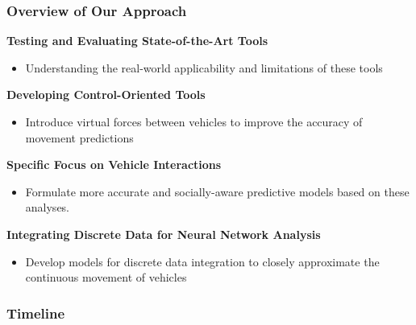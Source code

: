 \begin{frame}
  \frametitle{Overview of Our Approach}

    \textbf{Testing and Evaluating State-of-the-Art Tools}
        \begin{itemize}[]
            \item Understanding the real-world applicability and limitations of these tools
        \end{itemize}

    \textbf{Developing Control-Oriented Tools}
        \begin{itemize}[]
            \item Introduce virtual forces between vehicles to improve the accuracy of movement predictions
        \end{itemize}
    
    \textbf{Specific Focus on Vehicle Interactions}
        \begin{itemize}[]
            \item Formulate more accurate and socially-aware predictive models based on these analyses.
        \end{itemize}

    \textbf{Integrating Discrete Data for Neural Network Analysis}
        \begin{itemize}[]
            \item Develop models for discrete data integration to closely approximate the continuous movement of vehicles
        \end{itemize}
\end{frame}


\begin{frame}
  \frametitle{Timeline}

    
\end{frame}

